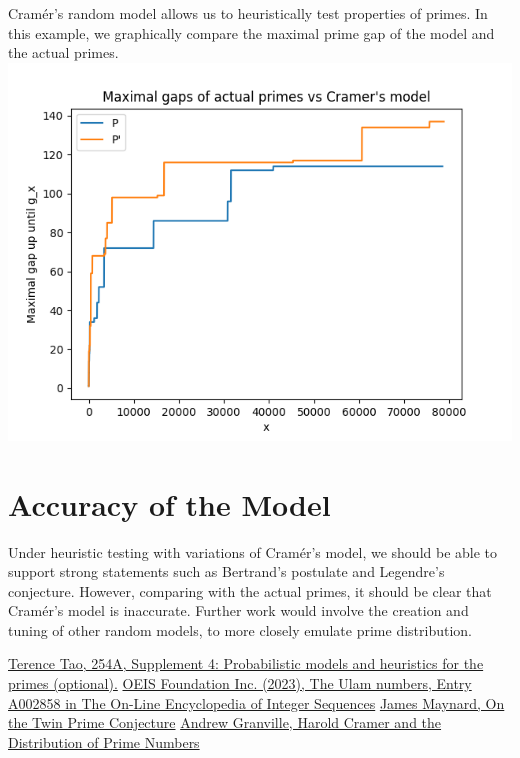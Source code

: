 \documentclass[conference]{IEEEtran}
\begin{document}
Cram\'er's random model allows us to heuristically test properties of primes.
In this example, we graphically compare the maximal prime gap of the model and the actual primes.
\includegraphics[scale=0.5]{graph.png}

\section{Accuracy of the Model}

Under heuristic testing with variations of Cram\'er's model, we should be able to support strong statements such as Bertrand's postulate and Legendre's conjecture. However, comparing with the actual primes, it should be clear that Cram\'er's model is inaccurate. Further work would involve the creation and tuning of other random models, to more closely emulate prime distribution.


\begin{thebibliography}{00}
     \href{https://terrytao.wordpress.com/2015/01/04/254a-supplement-4-probabilistic-models-and-heuristics-for-the-primes-optional.}{Terence Tao, 254A, Supplement 4: Probabilistic models and heuristics for the primes (optional).}
     \href{https://oeis.org/A002858}{OEIS Foundation Inc. (2023), The Ulam numbers, Entry A002858 in The On-Line Encyclopedia of Integer Sequences}
     \href{https://arxiv.org/abs/1910.14674}{James Maynard, On the Twin Prime Conjecture}
     \href{https://chance.dartmouth.edu/chance_news/for_chance_news/Riemann/cramer.pdf}{Andrew Granville, Harold Cramer and the Distribution of Prime Numbers}
\end{thebibliography}
\vspace{12pt}
\end{document}
